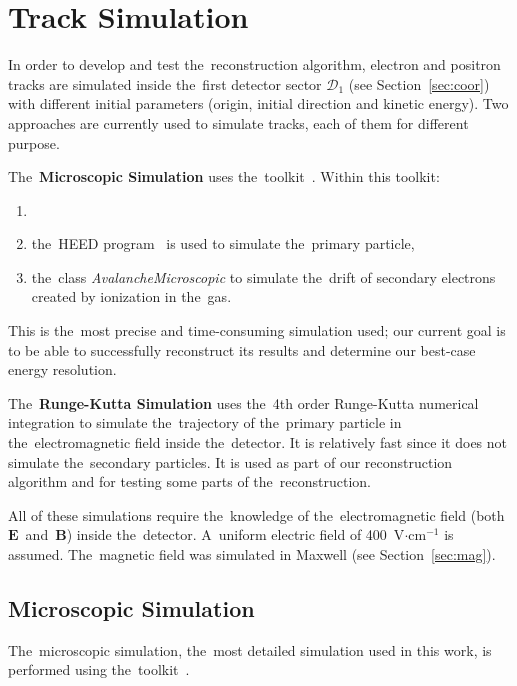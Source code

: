 \chapter{Track Simulation}
	In order to develop and test the~reconstruction algorithm, electron and positron tracks are simulated inside the~first detector sector $\mathcal{D}_1$ (see Section~\ref{sec:coor}) with different initial parameters (origin, initial direction and kinetic energy). Two approaches are currently used to simulate tracks, each of them for different purpose.
	
	The~\textbf{Microscopic Simulation} uses the~\garfieldpp toolkit~\cite{Garfield++}. Within this toolkit:
		\begin{enumerate}[nosep,label=\alph*)]
			\item {}
			\item the~\ac{HEED} program~\cite{HEED} is used to simulate the~primary particle,
			\item the~class \textit{AvalancheMicroscopic} to simulate the~drift of secondary electrons created by ionization in the~gas.
		\end{enumerate}
	This is the~most precise and time-consuming simulation used; our current goal is to be able to successfully reconstruct its results and determine our best-case energy resolution.
	
	The~\textbf{Runge-Kutta Simulation} uses the~4th order Runge-Kutta numerical integration to simulate the~trajectory of the~primary particle in the~electromagnetic field inside the~detector. It is relatively fast since it does not simulate the~secondary particles. It is used as part of our reconstruction algorithm and for testing some parts of the~reconstruction.
	
	All of these simulations require the~knowledge of the~electromagnetic field (both $\mathbf{E}$~and~$\mathbf{B}$) inside the~detector. A~uniform electric field of 400~V$\cdot$cm$^{-1}$ is assumed. The~magnetic field was simulated in Maxwell (see Section~\ref{sec:mag}).
	
	
	\section{Microscopic Simulation}
	\label{sec:microsim}
		The~microscopic simulation, the~most detailed simulation used in this work, is performed using the~\garfieldpp toolkit~\cite{Garfield++}.
		
